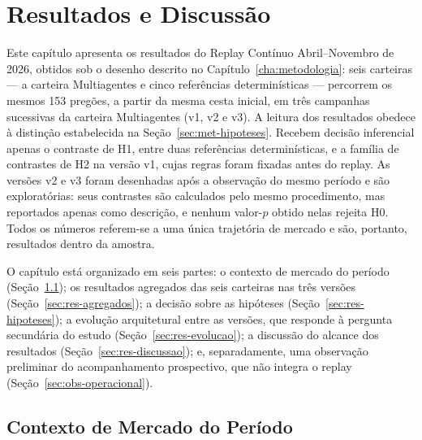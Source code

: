 \chapter{Resultados e Discussão}
\label{cha:resultados}

Este capítulo apresenta os resultados do Replay Contínuo Abril--Novembro de 2026, obtidos sob o desenho descrito no Capítulo~\ref{cha:metodologia}: seis carteiras --- a carteira Multiagentes e cinco referências determinísticas --- percorrem os mesmos 153 pregões, a partir da mesma cesta inicial, em três campanhas sucessivas da carteira Multiagentes (v1, v2 e v3). A leitura dos resultados obedece à distinção estabelecida na Seção~\ref{sec:met-hipoteses}. Recebem decisão inferencial apenas o contraste de H1, entre duas referências determinísticas, e a família de contrastes de H2 na versão v1, cujas regras foram fixadas antes do replay. As versões v2 e v3 foram desenhadas após a observação do mesmo período e são exploratórias: seus contrastes são calculados pelo mesmo procedimento, mas reportados apenas como descrição, e nenhum valor-$p$ obtido nelas rejeita H0. Todos os números referem-se a uma única trajetória de mercado e são, portanto, resultados dentro da amostra.

O capítulo está organizado em seis partes: o contexto de mercado do período (Seção~\ref{sec:res-mercado}); os resultados agregados das seis carteiras nas três versões (Seção~\ref{sec:res-agregados}); a decisão sobre as hipóteses (Seção~\ref{sec:res-hipoteses}); a evolução arquitetural entre as versões, que responde à pergunta secundária do estudo (Seção~\ref{sec:res-evolucao}); a discussão do alcance dos resultados (Seção~\ref{sec:res-discussao}); e, separadamente, uma observação preliminar do acompanhamento prospectivo, que não integra o replay (Seção~\ref{sec:obs-operacional}).

\section{Contexto de Mercado do Período}
\label{sec:res-mercado}

